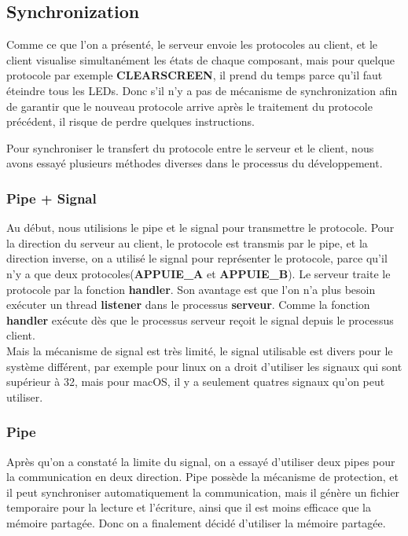 \documentclass[14px]{article}
\begin{document}
\subsection{Synchronization}
Comme ce que l'on a présenté, le serveur envoie les protocoles au client, et le client visualise simultanément les états de chaque composant, mais pour quelque protocole par exemple \textbf{CLEARSCREEN}, il prend du temps parce qu'il faut éteindre tous les LEDs. Donc s'il n'y a pas de mécanisme de synchronization afin de garantir que le nouveau protocole arrive après le traitement du protocole précédent, il risque de perdre quelques instructions.

Pour synchroniser le transfert du protocole entre le serveur et le client, nous avons essayé plusieurs méthodes diverses dans le processus du développement.


\subsubsection{Pipe + Signal}
Au début, nous utilisions le pipe et le signal pour transmettre le protocole. Pour la direction du serveur au client, le protocole est transmis par le pipe, et la direction inverse, on a utilisé le signal pour représenter le protocole, parce qu'il n'y a que deux protocoles(\textbf{APPUIE\_A} et \textbf{APPUIE\_B}). Le serveur traite le protocole par la fonction \textbf{handler}.
Son avantage est que l'on n'a plus besoin exécuter un thread \textbf{listener} dans le processus \textbf{serveur}. Comme la fonction \textbf{handler} exécute dès que le processus serveur reçoit le signal depuis le processus client. \\
Mais la mécanisme de signal est très limité, le signal utilisable est divers pour le système différent, par exemple pour linux on a droit d'utiliser les signaux qui sont supérieur à 32, mais pour macOS, il y a seulement quatres signaux qu'on peut utiliser.

\subsubsection{Pipe}
Après qu'on a constaté la limite du signal, on a essayé d'utiliser deux pipes pour la communication en deux direction. Pipe possède la mécanisme de protection, et il peut  synchroniser automatiquement la communication, mais il génère un fichier temporaire pour la lecture et l'écriture, ainsi que il est moins efficace que la mémoire partagée. Donc on a finalement décidé d'utiliser la mémoire partagée.
\end{document}
